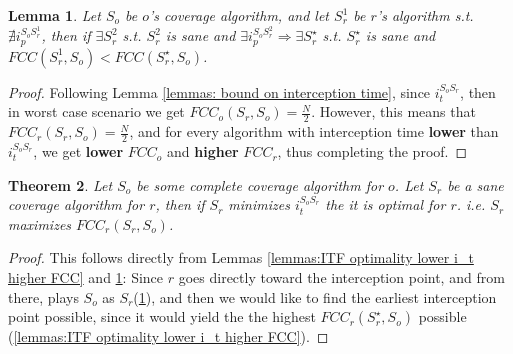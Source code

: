 \documentclass[a4paper,10pt]{article}
\newtheorem{theorem}{Theorem}[section]
\newtheorem{lemma}[theorem]{Lemma}
\newcommand\rob{\ensuremath{r}\xspace}
\newcommand\opp{\ensuremath{o}\xspace}
\newcommand{\fcc}{\ensuremath{FCC}\xspace}
\begin{document}
\begin{lemma} \label{lemmas: ITF optimality prefer S with i_p}
Let $S_{\opp}$ be \opp's coverage algorithm, and let $S_{\rob}^1$ be \rob's algorithm s.t. $\nexists i_p^{S_{\opp} S_{\rob}^1}$, then if $\exists S_{\rob}^2$ s.t. $S_{\rob}^2$ is sane and $\exists i_p^{S_{\opp} S_{\rob}^2}\Rightarrow \exists S_{\rob}^{\star}$ s.t. $S_{\rob}^{\star}$ is sane and $\fcc(S_{\rob}^1, S_{\opp}) < \fcc(S_{\rob}^{\star}, S_{\opp})$.
\end{lemma}

\begin{proof}
Following Lemma \ref{lemmas: bound on interception time}, since $i_t^{S_{\opp} S_{\rob}}$, then in worst case scenario we get $\fcc_{\opp}(S_{\rob}, S_{\opp})=
\frac{N}{2}$. However, this means that $\fcc_{\rob}(S_{\rob}, S_{\opp})=\frac{N}{2}$, and for every algorithm with interception time \textbf{lower} than $i_t^{S_{\opp} S_{\rob}}$, we get \textbf{lower} $\fcc_{\opp}$ and \textbf{higher} $\fcc_{\rob}$, thus completing the proof.
\end{proof}

\begin{theorem}\label{theorems:FullInformationStrategy}
Let $S_{\opp}$ be some complete coverage algorithm for \opp. Let $S_{\rob}$ be a sane coverage algorithm for \rob, then if $S_{\rob}$ minimizes $i_t^{S_{\opp} S_{\rob}}$ the it is optimal for \rob. i.e. $S_{\rob}$ maximizes $\fcc_{\rob}(S_{\rob}, S_{\opp})$.
\end{theorem}
\begin{proof}
This follows directly from Lemmas \ref{lemmas:ITF optimality lower i_t higher FCC}  and \ref{lemmas: ITF optimality prefer S with i_p}: Since \rob goes directly toward the interception point, and from there, plays $S_{\opp}$ as $S_{\rob}$(\ref{lemmas: ITF optimality prefer S with i_p}), and then we would like to find the earliest interception point possible, since it would yield the the highest $\fcc_{\rob}(S_{\rob}^\star, S_{\opp})$ possible (\ref{lemmas:ITF optimality lower i_t higher FCC}).
\end{proof}
\end{document}
